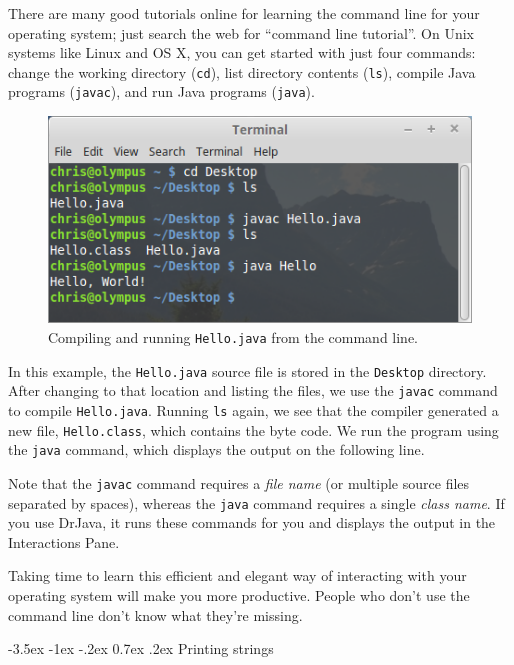 \documentclass[12pt]{book}
\makeatletter
\theoremstyle{exercise}
\renewcommand{\section}{\@startsection{section}{1}{\z@}%
    {-3.5ex \@plus -1ex \@minus -.2ex}%
    {0.7ex \@plus.2ex}%
    {\normalfont\Large\bfseries}}
\makeatother
\begin{document}
There are many good tutorials online for learning the command line for your operating system; just search the web for ``command line tutorial''.
On Unix systems like Linux and OS X, you can get started with just four commands: change the working directory ({\tt cd}), list directory contents ({\tt ls}), compile Java programs ({\tt javac}), and run Java programs ({\tt java}).

\begin{figure}[!h]
\begin{center}
\includegraphics[width=4.5in]{figs/terminal.png}
\caption{Compiling and running {\tt Hello.java} from the command line.}
\end{center}
\end{figure}

In this example, the {\tt Hello.java} source file is stored in the {\tt Desktop} directory.
After changing to that location and listing the files, we use the {\tt javac} command to compile {\tt Hello.java}.
Running {\tt ls} again, we see that the compiler generated a new file, {\tt Hello.class}, which contains the byte code.
We run the program using the {\tt java} command, which displays the output on the following line.

Note that the {\tt javac} command requires a {\em file name} (or multiple source files separated by spaces), whereas the {\tt java} command requires a single {\em class name}.
If you use DrJava, it runs these commands for you and displays the output in the Interactions Pane.

Taking time to learn this efficient and elegant way of interacting with your operating system will make you more productive.
People who don't use the command line don't know what they're missing.


\section{Printing strings}
\end{document}
